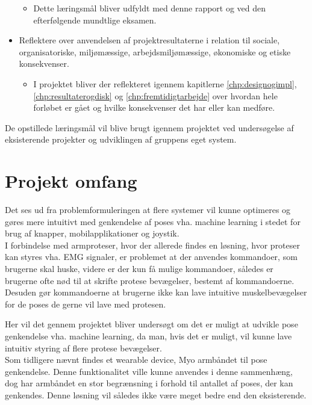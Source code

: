 \begin{itemize}
	\begin{itemize}
		\item Dette læringsmål bliver udfyldt med denne rapport og ved den efterfølgende mundtlige eksamen.
	\end{itemize}
	\item Reflektere over anvendelsen af projektresultaterne i relation til sociale, organisatoriske, miljømæssige, arbejdsmiljømæssige, økonomiske og etiske konsekvenser.
	\begin{itemize}
		\item I projektet bliver der reflekteret igennem kapitlerne \ref{chp:designogimpl}, \ref{chp:resultaterogdisk} og \ref{chp:fremtidigtarbejde} over hvordan hele forløbet er gået og hvilke konsekvenser det har eller kan medføre.
	\end{itemize}
\end{itemize}

De opstillede læringsmål vil blive brugt igennem projektet ved undersøgelse af eksisterende projekter og udviklingen af gruppens eget system.\\


\section{Projekt omfang}
Det ses ud fra problemformuleringen at flere systemer vil kunne optimeres og gøres mere intuitivt med genkendelse af poses vha. machine learning i stedet for brug af knapper, mobilapplikationer og joystik. \\

I forbindelse med armproteser, hvor der allerede findes en løsning, hvor proteser kan styres vha. EMG signaler, er problemet at der anvendes kommandoer, som brugerne skal huske, videre er der kun få mulige kommandoer, således er brugerne ofte nød til at skrifte protese bevægelser, bestemt af kommandoerne. Desuden gør kommandoerne at brugerne ikke kan lave intuitive muskelbevægelser for de poses de gerne vil lave med protesen. 

Her vil det gennem projektet bliver undersøgt om det er muligt at udvikle pose genkendelse vha. machine learning, da man, hvis det er muligt, vil kunne lave intuitiv styring af flere protese bevægelser. \\
Som tidligere nævnt findes et wearable device, Myo armbåndet til pose genkendelse. Denne funktionalitet ville kunne anvendes i denne sammenhæng, dog har armbåndet en stor begrænsning i forhold til antallet af poses, der kan genkendes. Denne løsning vil således ikke være meget bedre end den eksisterende.\\

